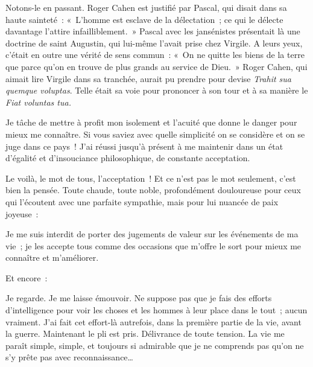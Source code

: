 \documentclass[french,twoside]{book} %
\newenvironment{quoteblock}%
  {\begin{quoting}}
  {\end{quoting}}
\newenvironment{quotebar}{%
    \def\FrameCommand{{\color{rubric!10!}\vrule width 0.5em} \hspace{0.9em}}%
    \def\OuterFrameSep{\itemsep} %
    \MakeFramed {\advance\hsize-\width \FrameRestore}
  }%
  {%
    \endMakeFramed
  }
\renewenvironment{quoteblock}%
  {%
    \savenotes
    \setstretch{0.9}
    \normalfont
    \begin{quotebar}
  }
  {%
    \end{quotebar}
    \spewnotes
  }
\begin{document}
Notons-le en passant. Roger Cahen est justifié par Pascal, qui disait dans sa haute sainteté : « L’homme est esclave de la délectation ; ce qui le délecte davantage l’attire infailliblement. » Pascal avec les jansénistes présentait là une doctrine de saint Augustin, qui lui-même l’avait prise chez Virgile. A leurs yeux, c’était en outre une vérité de sens commun : « On ne quitte les biens de la terre que parce qu’on en trouve de plus grands au service de Dieu. » Roger Cahen, qui aimait lire Virgile dans sa tranchée, aurait pu prendre pour devise {\itshape Trahit sua quemque voluptas}. Telle était sa voie pour prononcer à son tour et à sa manière le {\itshape Fiat voluntas tua.}‌\par

\begin{quoteblock}
 \noindent Je tâche de mettre à profit mon isolement et l’acuité que donne le danger pour mieux me connaître. Si vous saviez avec quelle simplicité on se considère et on se juge dans ce pays ! J’ai réussi jusqu’à présent à me maintenir dans un état d’égalité et d’insouciance philosophique, de constante acceptation.‌
 \end{quoteblock}

\noindent Le voilà, le mot de tous, l’acceptation ! Et ce n’est pas le mot seulement, c’est bien la pensée. Toute chaude, toute noble, profondément douloureuse pour ceux qui l’écoutent avec une parfaite sympathie, mais pour lui nuancée de paix joyeuse :‌\par

\begin{quoteblock}
 \noindent Je me suis interdit de porter des jugements de valeur sur les événements de ma vie ; je les accepte tous comme des occasions que m’offre le sort pour mieux me connaître et m’améliorer.‌
 \end{quoteblock}

\noindent Et encore :‌\par

\begin{quoteblock}
 \noindent Je regarde. Je me laisse émouvoir. Ne suppose pas que je fais des efforts d’intelligence pour voir les choses et les hommes à leur place dans le tout ; aucun vraiment. J’ai fait cet effort-là autrefois, dans la première partie de la vie, avant la guerre. Maintenant le pli est pris. Délivrance de toute tension. La vie me paraît simple, simple, et toujours si admirable que je ne comprends pas qu’on ne s’y prête pas avec reconnaissance…‌
 \end{quoteblock}
\end{document}

